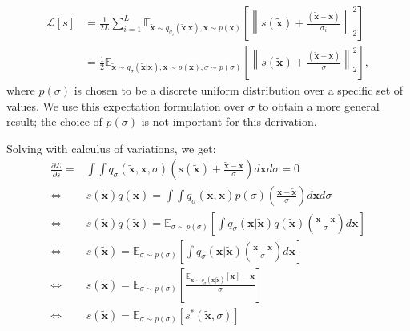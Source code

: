 \documentclass{article} \usepackage{iclr2021_conference_notitle,times}
\theoremstyle{definition}
\theoremstyle{definition}
\newcommand{\norm}[1]{\left\lVert#1\right\rVert}
\begin{document}
\begin{align}
\mathcal{L}[s] &= \frac{1}{2L} \sum_{i=1}^L  \mathbb{E}_{\boldsymbol{\tilde{x}} \sim q_{\sigma_i}(\boldsymbol{\tilde{x}}|\boldsymbol{x}), \boldsymbol{x} \sim p(\boldsymbol{x})}\left[ \norm{s(\boldsymbol{\tilde{x}}) + \frac{(\boldsymbol{\tilde{x}} - \boldsymbol{x})}{\sigma_i} }_2^2 \right] \\
&= \frac{1}{2} \mathbb{E}_{\boldsymbol{\tilde{x}} \sim q_{\sigma}(\boldsymbol{\tilde{x}}|\boldsymbol{x}), \boldsymbol{x} \sim p(\boldsymbol{x}), \sigma \sim p(\sigma)}\left[ \norm{s(\boldsymbol{\tilde{x}}) + \frac{(\boldsymbol{\tilde{x}} - \boldsymbol{x})}{\sigma} }_2^2 \right],
\end{align}
where $p(\sigma)$ is chosen to be a discrete uniform distribution over a specific set of values. We use this expectation formulation over $\sigma$ to obtain a more general result; the choice of $p(\sigma)$ is not important for this derivation.

Solving with calculus of variations, we get:
\begin{align*} \frac{\partial \mathcal{L}}{\partial s} = &\int \int q_{\sigma}(\boldsymbol{\tilde{x}},\boldsymbol{x},\sigma)\left(s(\boldsymbol{\tilde{x}}) + \frac{\boldsymbol{\tilde{x}} - \boldsymbol{x}}{\sigma}\right)d\boldsymbol{x} d\sigma= 0 \\
\iff &s(\boldsymbol{\tilde{x}})q(\boldsymbol{\tilde{x}}) = \int \int q_{\sigma}(\boldsymbol{\tilde{x}},\boldsymbol{x})p(\sigma) \left(\frac{\boldsymbol{x} - \boldsymbol{\tilde{x}}}{\sigma}\right) d\boldsymbol{x} d\sigma \\
\iff &s(\boldsymbol{\tilde{x}})q(\boldsymbol{\tilde{x}}) = \mathbb{E}_{\sigma \sim p(\sigma)} \left[ \int q_{\sigma}(\boldsymbol{x}|\boldsymbol{\tilde{x}})q(\boldsymbol{\tilde{x}}) \left(\frac{\boldsymbol{x} - \boldsymbol{\tilde{x}}}{\sigma}\right) d\boldsymbol{x} \right] \\
\iff &s(\boldsymbol{\tilde{x}}) = \mathbb{E}_{\sigma \sim p(\sigma)} \left[ \int q_{\sigma}(\boldsymbol{x}|\boldsymbol{\tilde{x}}) \left(\frac{\boldsymbol{x} - \boldsymbol{\tilde{x}}}{\sigma}\right) d\boldsymbol{x} \right] \\
\iff &s(\boldsymbol{\tilde{x}}) = \mathbb{E}_{\sigma \sim p(\sigma)} \left[  \frac{\mathbb{E}_{\boldsymbol{x} \sim q_{\sigma}(\boldsymbol{x} | \boldsymbol{\tilde{x}})}[\boldsymbol{x}] - \boldsymbol{\tilde{x}}}{\sigma} \right] \\
\iff &s(\boldsymbol{\tilde{x}}) = \mathbb{E}_{\sigma \sim p(\sigma)} \left[ s^{*}(\boldsymbol{\tilde{x}}, \sigma) \right]
\end{align*}
\end{document}
